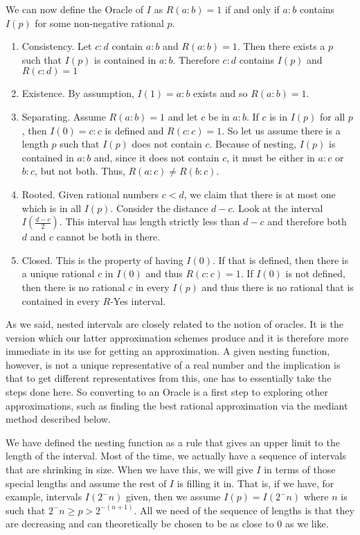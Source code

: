 \documentclass[12pt]{article}
\theoremstyle{remark}
\begin{document}
We can now define the Oracle of $I$ as $R(a:b) = 1$ if and only if $a:b$ contains $I(p)$ for some non-negative rational $p$.

\begin{enumerate}
    \item Consistency. Let $c:d$ contain $a:b$ and $R(a:b)=1$. Then there exists a $p$ such that $I(p)$ is contained in $a:b$. Therefore $c:d$ contains $I(p)$ and $R(c:d) = 1$
    \item Existence. By assumption, $I(1)=a:b$ exists and so $R(a:b)=1$.
    \item Separating. Assume $R(a:b)=1$ and let $c$ be in $a:b$. If $c$ is in $I(p)$ for all $p$, then $I(0) = c:c$ is defined and $R(c:c)=1$. So let us assume there is a length $p$ such that $I(p)$ does not contain $c$. Because of nesting, $I(p)$ is contained in $a:b$ and, since it does not contain $c$, it must be either in $a:c$ or $b:c$, but not both. Thus, $R(a:c) \neq R(b:c)$.
    \item Rooted. Given rational numbers $c < d$, we claim that there is at most one which is in all $I(p)$. Consider the distance $d-c$. Look at the interval $I( \tfrac{d-c}{2} )$. This interval has length strictly less than $d-c$ and therefore both $d$ and $c$ cannot be both in there. 
    \item Closed. This is the property of having $I(0)$. If that is defined, then  there is a unique rational $c$ in $I(0)$ and thus $R(c:c)=1$. If $I(0)$ is not defined, then there is no rational $c$ in every $I(p)$ and thus there is no rational that is contained in every $R$-Yes interval. 
\end{enumerate}

As we said, nested intervals are closely related to the notion of oracles. It is the version which our latter approximation schemes produce and it is therefore more immediate in its use for getting an approximation. A given nesting function, however, is not a unique representative of a real number and the implication is that to get different representatives from this, one has to essentially take the steps done here. So converting to an Oracle is a first step to exploring other approximations, such as finding the best rational approximation via the mediant method described below. 

We have defined the nesting function as a rule that gives an upper limit to the length of the interval. Most of the time, we actually have a sequence of intervals that are shrinking in size. When we have this, we will give $I$ in terms of those special lengths and assume the rest of $I$ is filling it in. That is, if we have, for example, intervals $I(2^-n)$ given, then we assume $I(p) = I(2^-n)$ where $n$ is such that $2^-n \geq p > 2^{-(n+1)}$. All we need of the sequence of lengths is that they are decreasing and can theoretically be chosen to be as close to 0 as we like. 
\end{document}
